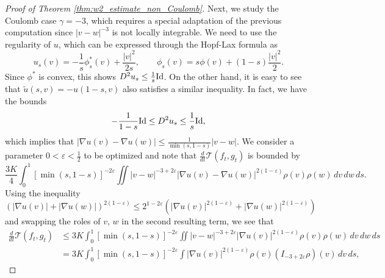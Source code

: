 \documentclass[11pt]{amsart}
\numberwithin{equation}{section}
\begin{document}
\begin{proof}[Proof of Theorem \ref{thm:w2_estimate_non_Coulomb}]
Next, we study the Coulomb case $\gamma = -3$, which requires a special adaptation of the previous computation since $|v-w|^{-3}$ is not locally integrable. We need to use the regularity of $u$, which can be expressed through the Hopf-Lax formula as
  \begin{equation}\label{eq:Hopf_lax}
    u_{s}(v)=-\frac{1}{s}\phi_{s}^{*}(v)+\frac{|v|^{2}}{2s},\qquad\phi_{s}(v)=s\phi(v)+(1-s)\frac{|v|^{2}}{2}.
  \end{equation}
  Since $\phi^{*}$ is convex, this shows $D^{2}u_{s}\leq\frac{1}{s}\textnormal{Id}$. On the other hand, it is easy to see that $\tilde{u}(s,v)=-u(1-s,v)$ also satisfies a similar inequality. In fact, we have the bounds
  \begin{equation*}
    -\frac{1}{1-s}\textnormal{Id}\leq D^{2}u_{s}\leq\frac{1}{s}\textnormal{Id},
  \end{equation*}
  which implies that $\left|\nabla u(v)-\nabla u(w)\right|\leq\frac{1}{\min\left(s,1-s\right)}\left|v-w\right|$.
  We consider a parameter $0<\varepsilon<\frac{1}{2}$ to be optimized and note that $\frac{d}{dt}\mathcal{T}(f_t,g_t)$ is bounded by
%
%
\begin{equation*}
  \frac{3K}{4}\int_{0}^{1}\left[\min\left(s,1-s\right)\right]^{-2\varepsilon}\iint\left|v-w\right|^{-3+2\varepsilon}\left|\nabla u(v)-\nabla u(w)\right|^{2(1-\varepsilon)}\rho(v)\rho(w)\, dv\,dw\,ds.
\end{equation*}
%
%
%
Using the inequality $\left(\left|\nabla u(v)\right|+\left|\nabla u(w)\right|\right)^{2(1-\varepsilon)}\leq2^{1-2\varepsilon}\left(\left|\nabla u(v)\right|^{2(1-\varepsilon)}+\left|\nabla u(w)\right|^{2(1-\varepsilon)}\right)$ and swapping the roles of $v$, $w$ in the second resulting term, we see that
%
\begin{align*}
  \frac{d}{dt}\mathcal{T}(f_t,g_t) & \leq3K\int_{0}^{1}\left[\min\left(s,1-s\right)\right]^{-2\varepsilon}\iint\left|v-w\right|^{-3+2\varepsilon}\left|\nabla u(v)\right|^{2(1-\varepsilon)}\rho(v)\rho(w)\,dv\,dw\,ds	\\
  & =3K\int_{0}^{1}\left[\min\left(s,1-s\right)\right]^{-2\varepsilon}\int\left|\nabla u(v)\right|^{2(1-\varepsilon)}\rho(v)(I_{-3+2\varepsilon}\rho)(v)\,dv\,ds,

\end{align*}
\end{proof}
\end{document}
